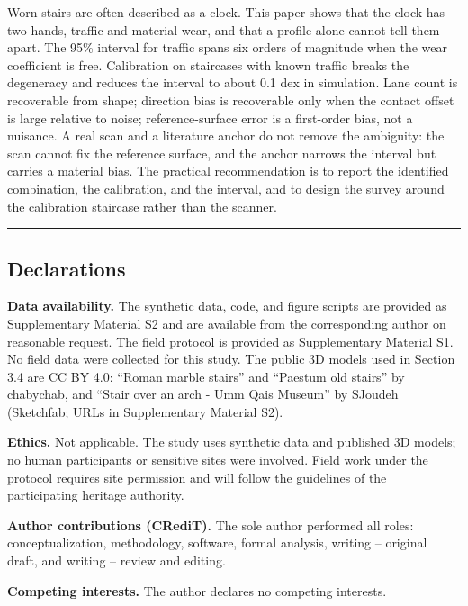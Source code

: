 \documentclass[
]{article}
\begin{document}
Worn stairs are often described as a clock. This paper shows that the
clock has two hands, traffic and material wear, and that a profile alone
cannot tell them apart. The 95\% interval for traffic spans six orders
of magnitude when the wear coefficient is free. Calibration on
staircases with known traffic breaks the degeneracy and reduces the
interval to about 0.1 dex in simulation. Lane count is recoverable from
shape; direction bias is recoverable only when the contact offset is
large relative to noise; reference-surface error is a first-order bias,
not a nuisance. A real scan and a literature anchor do not remove the
ambiguity: the scan cannot fix the reference surface, and the anchor
narrows the interval but carries a material bias. The practical
recommendation is to report the identified combination, the calibration,
and the interval, and to design the survey around the calibration
staircase rather than the scanner.

\begin{center}\rule{0.5\linewidth}{0.5pt}\end{center}

\subsection{Declarations}\label{declarations}

\textbf{Data availability.} The synthetic data, code, and figure scripts
are provided as Supplementary Material S2 and are available from the
corresponding author on reasonable request. The field protocol is
provided as Supplementary Material S1. No field data were collected for
this study. The public 3D models used in Section 3.4 are CC BY 4.0:
``Roman marble stairs'' and ``Paestum old stairs'' by chabychab, and
``Stair over an arch - Umm Qais Museum'' by SJoudeh (Sketchfab; URLs in
Supplementary Material S2).

\textbf{Ethics.} Not applicable. The study uses synthetic data and
published 3D models; no human participants or sensitive sites were
involved. Field work under the protocol requires site permission and
will follow the guidelines of the participating heritage authority.

\textbf{Author contributions (CRediT).} The sole author performed all
roles: conceptualization, methodology, software, formal analysis,
writing -- original draft, and writing -- review and editing.

\textbf{Competing interests.} The author declares no competing
interests.
\end{document}
